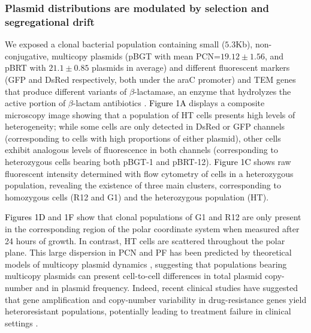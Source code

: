 \documentclass[fleqn,12pt]{wlscirep}
\newcommand{\fig}[1]{\textcolor{black}{#1}}
\begin{document}
\subsubsection{Plasmid distributions are modulated by selection and segregational drift}
We exposed a clonal bacterial population containing small ($5.3$Kb), non-conjugative, multicopy plasmids (pBGT with mean PCN=$19.12\pm1.56$, and pBRT with $21.1\pm0.85$ plasmids in average\cite{san2016multicopy}) and different fluorescent markers (GFP and DsRed respectively, both under the araC promoter) and TEM genes that produce different variants of $\beta$-lactamase, an enzyme that hydrolyzes the active portion of $\beta$-lactam antibiotics \cite{Knox1995}. 
\fig{Figure 1A} displays a composite microscopy image showing that a population of HT cells presents high levels of heterogeneity; while some cells are only detected in DsRed or GFP channels (corresponding to cells with high proportions of either plasmid), other cells exhibit analogous levels of fluorescence in both channels (corresponding to heterozygous cells bearing both pBGT-1 and pBRT-12).  \fig{Figure 1C} shows raw fluorescent intensity determined with flow cytometry of cells in a heterozygous population, revealing the existence of three main clusters, corresponding to homozygous cells (R12 and G1) and the heterozygous population (HT).

 \fig{Figures 1D} and \fig{1F} show that clonal populations of G1 and R12 are only present in the corresponding region of the polar coordinate system when measured after 24 hours of growth.  
In contrast, HT cells are scattered throughout the polar plane. This large dispersion in PCN and PF has been predicted by theoretical models of multicopy plasmid dynamics \cite{pena2015evaluating, Munch2019,ref}, suggesting that populations bearing multicopy plasmids can present cell-to-cell differences in total plasmid copy-number and in plasmid frequency. 
Indeed, recent clinical studies have suggested that gene amplification and copy-number variability in drug-resistance genes yield heteroresistant populations\cite{andersson2019mechanisms}, potentially leading to treatment failure in clinical settings \cite{nicoloff2019high,wang2014heteroresistance, band2019heteroresistance}.
\end{document}
